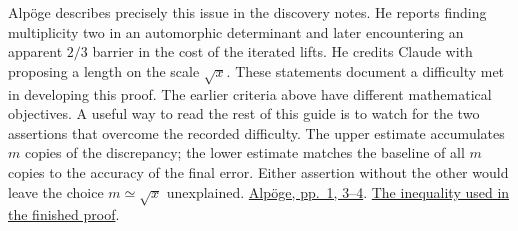 \documentclass[11pt,letterpaper]{article}
\newcommand{\sref}[2]{\href{https://github.com/VladimirReshetnikov/ProveIt/blob/d8415e76ad850651f8c0083afe689dd9f4a45a10/Analysis/GeneralizedRiemannHypothesis/vendor/grh-lean/grh/src/#1.lean}{#2}}
\begin{document}
Alpöge describes precisely this issue in the discovery notes. He reports finding multiplicity two in an automorphic determinant and later encountering an apparent \(2/3\) barrier in the cost of the iterated lifts. He credits Claude with proposing a length on the scale \(\sqrt{x}\). These statements document a difficulty met in developing this proof. The earlier criteria above have different mathematical objectives. A useful way to read the rest of this guide is to watch for the two assertions that overcome the recorded difficulty. The upper estimate accumulates \(m\) copies of the discrepancy; the lower estimate matches the baseline of all \(m\) copies to the accuracy of the final error. Either assertion without the other would leave the choice \(m\simeq\sqrt{x}\) unexplained. \href{https://alpo.ge/remark.pdf}{Alpöge, pp.~1, 3--4}. \sref{New/Reduction/MainInequality}{The inequality used in the finished proof}.
\end{document}
